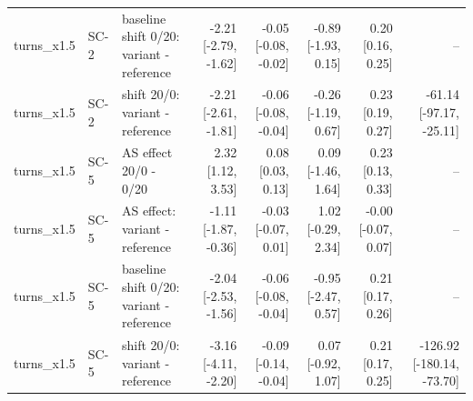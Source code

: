 \begin{table}[htbp]
{\begin{tabular}{lllrrrrr}
turns\_x1.5 & SC-2 & baseline shift 0/20: variant - reference & -2.21 [-2.79, -1.62] & -0.05 [-0.08, -0.02] & -0.89 [-1.93, 0.15] & 0.20 [0.16, 0.25] & -- \\
turns\_x1.5 & SC-2 & shift 20/0: variant - reference & -2.21 [-2.61, -1.81] & -0.06 [-0.08, -0.04] & -0.26 [-1.19, 0.67] & 0.23 [0.19, 0.27] & -61.14 [-97.17, -25.11] \\
turns\_x1.5 & SC-5 & AS effect 20/0 - 0/20 & 2.32 [1.12, 3.53] & 0.08 [0.03, 0.13] & 0.09 [-1.46, 1.64] & 0.23 [0.13, 0.33] & -- \\
turns\_x1.5 & SC-5 & AS effect: variant - reference & -1.11 [-1.87, -0.36] & -0.03 [-0.07, 0.01] & 1.02 [-0.29, 2.34] & -0.00 [-0.07, 0.07] & -- \\
turns\_x1.5 & SC-5 & baseline shift 0/20: variant - reference & -2.04 [-2.53, -1.56] & -0.06 [-0.08, -0.04] & -0.95 [-2.47, 0.57] & 0.21 [0.17, 0.26] & -- \\
turns\_x1.5 & SC-5 & shift 20/0: variant - reference & -3.16 [-4.11, -2.20] & -0.09 [-0.14, -0.04] & 0.07 [-0.92, 1.07] & 0.21 [0.17, 0.25] & -126.92 [-180.14, -73.70] \\
\bottomrule
\end{tabular}}
\end{table}
